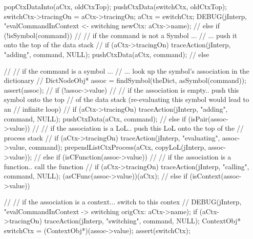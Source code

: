 {{{      popCtxDataInto(aCtx, oldCtxTop);
      pushCtxData(switchCtx, oldCtxTop);
      switchCtx->tracingOn = aCtx->tracingOn;
      aCtx = switchCtx;
      DEBUG(jInterp, "evalCommandInContext <- switching newCtx: %
            aCtx->name);
      //
    } else if (!isSymbol(command)) {
      //
      // if the command is not a Symbol ...
      //  ...  push it onto the top of the data stack
      //
      if (aCtx->tracingOn)
        traceAction(jInterp, "adding", command, NULL);
      pushCtxData(aCtx, command);
      //
    } else {
      //
      // if the command is a symbol ...
      //  ... look up the symbol's association in the dictionary
      //
      DictNodeObj* assoc = findSymbol(theDict, asSymbol(command));
      assert(assoc);
      //
      if (!assoc->value) {
        //
        // if the association is empty.. push this symbol onto the top
        // of the data stack (re-evaluating this symbol would lead to an
        // infinite loop)
        //
        if (aCtx->tracingOn)
          traceAction(jInterp, "adding", command, NULL);
        pushCtxData(aCtx, command);
        //
      } else if (isPair(assoc->value)) {
        //
        // if the association is a LoL.. push this LoL onto the top of the
        // process stack
        //
        if (aCtx->tracingOn)
          traceAction(jInterp, "evaluating", assoc->value, command);
        prependListCtxProcess(aCtx,
          copyLoL(jInterp, assoc->value));
        //
      } else if (isCFunction(assoc->value)) {
        //
        // if the association is a function.. call the function
        //
        if (aCtx->tracingOn)
          traceAction(jInterp, "calling", command, NULL);
        (asCFunc(assoc->value))(aCtx);
        //
      } else if (isContext(assoc->value)) {
        //
        // if the association is a context... switch to this contex
        //
        DEBUG(jInterp, "evalCommandInContext -> switching origCtx: %
              aCtx->name);
        if (aCtx->tracingOn)
          traceAction(jInterp, "switching", command, NULL);
        ContextObj* switchCtx = (ContextObj*)(assoc->value);
        assert(switchCtx);

}}}}
